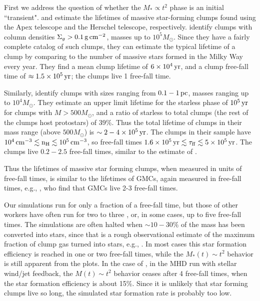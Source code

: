 \documentclass[../dissertation.tex]{subfiles}
\begin{document}
First we address the question of whether the $M_*\propto t^2$ phase is an initial ``transient".
\citet{2012A&A...540A.113T} and \citet{2015MNRAS.451.3089T} estimate the lifetimes of massive 
star-forming clumps found using the Apex telescope and the Herschel telescope, respectively.
\citet{2012A&A...540A.113T} identify clumps with  column densities $\Sigma_g> 0.1\,\rm g\,\rm cm^{-2}$,
masses up to $10^5M_\odot$. Since they have a fairly complete catalog of such clumps, they can
estimate the typical lifetime of a clump by comparing to the number of massive stars formed in 
the Milky Way every year. They find a mean clump lifetime of $6\times10^4\,\rm yr$, and a clump 
free-fall time of $\approx1.5\times10^5\,\rm yr$; the clumps live 1 free-fall time.

Similarly, \citet{2015MNRAS.451.3089T} identify clumps with sizes ranging from $0.1-1\,\rm pc$, masses
ranging up to $10^4M_\odot$. They estimate an upper limit lifetime for the starless phase of $10^5\,\rm yr$
for clumps with $M>500M_\odot$, and a ratio of starless to total clumps (the rest of the clumps host
protostars) of 39\%. Thus the total lifetime of clumps in their mass range (above $500 M_\odot$) is 
$\sim 2-4\times10^5\,\rm yr$. The clumps in their sample have 
$10^4\,\rm cm^{-3}\lesssim n_H\lesssim10^5\,\rm cm^{-3}$, so free-fall times
$1.6\times10^5\,\rm yr\lesssim\tau_{ff}\lesssim5\times10^5\,\rm yr$. The clumps live $0.2-2.5$ free-fall times, 
similar to the estimate of \citet{2012A&A...540A.113T}.

Thus the lifetimes of massive star forming clumps, when measured in units of free-fall times, is
similar to the lifetimes of GMCs, again measured in free-fall times, e.g.,
\citet{2007prpl.conf...81B}, who find that GMCs live 2-3 free-fall times.

Our simulations run for only a fraction of a free-fall time, but those of other workers 
have often run for two to three  \citep{2010ApJ...709...27W,2011ApJ...730...40P}, or, in 
some cases, up to five free-fall times. The simulations are often
halted when $\sim10-30\%$ of the mass has been converted into stars, since that is a rough 
observational estimate of the maximum fraction of clump gas turned into stars, e.g.,
 \citet{2003ARA&A..41...57L}. In most cases this star formation efficiency is reached in
one or two free-fall times, while the $M_*(t)\sim t^2$ behavior is still apparent from the
plots. In the case of \citet{2015MNRAS.450.4035F}, in the MHD run with stellar wind/jet feedback, the 
$M(t)\sim t^2$ behavior ceases after 4 free-fall times, when the star formation efficiency is 
about 15\%. Since it is unlikely that star forming clumps live so long, the simulated star 
formation rate is probably too low. 
\end{document}
